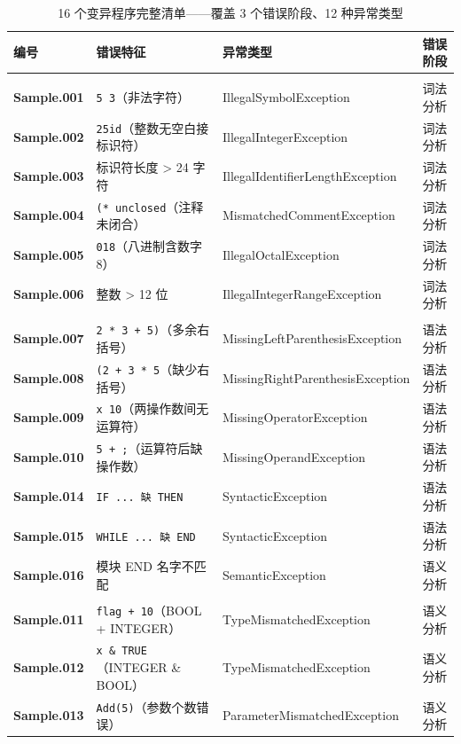 \documentclass[12pt,a4paper,fontset=none]{ctexart}
\begin{document}
\begin{table}[H]\centering
\tiny
\setlength{\tabcolsep}{2.5pt}
\begin{tabularx}{\textwidth}{>{\bfseries}P{1.2cm}>{\raggedright\arraybackslash}P{4.5cm}>{\raggedright\arraybackslash}P{3.5cm}>{\raggedright\arraybackslash}X}
\toprule
编号 & 错误特征 & 异常类型 & 错误阶段 \\
\midrule
{} \\
Sample.001 & \texttt{5 3}（非法字符） & IllegalSymbolException & 词法分析 \\
Sample.002 & \texttt{25id}（整数无空白接标识符） & IllegalIntegerException & 词法分析 \\
Sample.003 & 标识符长度 > 24 字符 & IllegalIdentifierLengthException & 词法分析 \\
Sample.004 & \texttt{(* unclosed}（注释未闭合） & MismatchedCommentException & 词法分析 \\
Sample.005 & \texttt{018}（八进制含数字 8） & IllegalOctalException & 词法分析 \\
Sample.006 & 整数 > 12 位 & IllegalIntegerRangeException & 词法分析 \\
\midrule
{} \\
Sample.007 & \texttt{2 * 3 + 5)}（多余右括号） & MissingLeftParenthesisException & 语法分析 \\
Sample.008 & \texttt{(2 + 3 * 5}（缺少右括号） & MissingRightParenthesisException & 语法分析 \\
Sample.009 & \texttt{x 10}（两操作数间无运算符） & MissingOperatorException & 语法分析 \\
Sample.010 & \texttt{5 + ;}（运算符后缺操作数） & MissingOperandException & 语法分析 \\
Sample.014 & \texttt{IF ... 缺 THEN} & SyntacticException & 语法分析 \\
Sample.015 & \texttt{WHILE ... 缺 END} & SyntacticException & 语法分析 \\
Sample.016 & 模块 END 名字不匹配 & SemanticException & 语义分析 \\
\midrule
{} \\
Sample.011 & \texttt{flag + 10}（BOOL + INTEGER） & TypeMismatchedException & 语义分析 \\
Sample.012 & \texttt{x \& TRUE}（INTEGER \& BOOL） & TypeMismatchedException & 语义分析 \\
Sample.013 & \texttt{Add(5)}（参数个数错误） & ParameterMismatchedException & 语义分析 \\
\bottomrule
\end{tabularx}
\caption{16 个变异程序完整清单——覆盖 3 个错误阶段、12 种异常类型}
\label{tab:mutants}
\end{table}
\end{document}
